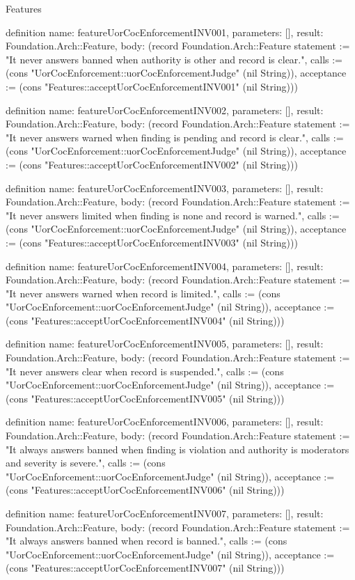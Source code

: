 \begin{lexlean}{Features}
\begin{semanticmodule}
definition{
  name: featureUorCocEnforcementINV001,
  parameters: [],
  result: Foundation.Arch::Feature,
  body: (record Foundation.Arch::Feature {statement := "It never answers banned when authority is other and record is clear.", calls := (cons "UorCocEnforcement::uorCocEnforcementJudge" (nil String)), acceptance := (cons "Features::acceptUorCocEnforcementINV001" (nil String))})
}

definition{
  name: featureUorCocEnforcementINV002,
  parameters: [],
  result: Foundation.Arch::Feature,
  body: (record Foundation.Arch::Feature {statement := "It never answers warned when finding is pending and record is clear.", calls := (cons "UorCocEnforcement::uorCocEnforcementJudge" (nil String)), acceptance := (cons "Features::acceptUorCocEnforcementINV002" (nil String))})
}

definition{
  name: featureUorCocEnforcementINV003,
  parameters: [],
  result: Foundation.Arch::Feature,
  body: (record Foundation.Arch::Feature {statement := "It never answers limited when finding is none and record is warned.", calls := (cons "UorCocEnforcement::uorCocEnforcementJudge" (nil String)), acceptance := (cons "Features::acceptUorCocEnforcementINV003" (nil String))})
}

definition{
  name: featureUorCocEnforcementINV004,
  parameters: [],
  result: Foundation.Arch::Feature,
  body: (record Foundation.Arch::Feature {statement := "It never answers warned when record is limited.", calls := (cons "UorCocEnforcement::uorCocEnforcementJudge" (nil String)), acceptance := (cons "Features::acceptUorCocEnforcementINV004" (nil String))})
}

definition{
  name: featureUorCocEnforcementINV005,
  parameters: [],
  result: Foundation.Arch::Feature,
  body: (record Foundation.Arch::Feature {statement := "It never answers clear when record is suspended.", calls := (cons "UorCocEnforcement::uorCocEnforcementJudge" (nil String)), acceptance := (cons "Features::acceptUorCocEnforcementINV005" (nil String))})
}

definition{
  name: featureUorCocEnforcementINV006,
  parameters: [],
  result: Foundation.Arch::Feature,
  body: (record Foundation.Arch::Feature {statement := "It always answers banned when finding is violation and authority is moderators and severity is severe.", calls := (cons "UorCocEnforcement::uorCocEnforcementJudge" (nil String)), acceptance := (cons "Features::acceptUorCocEnforcementINV006" (nil String))})
}

definition{
  name: featureUorCocEnforcementINV007,
  parameters: [],
  result: Foundation.Arch::Feature,
  body: (record Foundation.Arch::Feature {statement := "It always answers banned when record is banned.", calls := (cons "UorCocEnforcement::uorCocEnforcementJudge" (nil String)), acceptance := (cons "Features::acceptUorCocEnforcementINV007" (nil String))})
}


\end{semanticmodule}
\end{lexlean}
